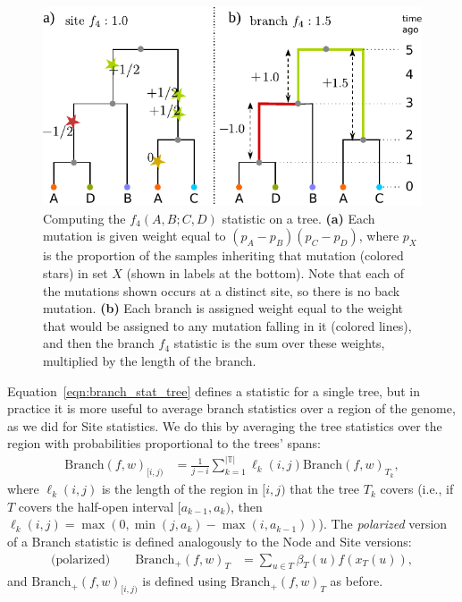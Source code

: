 \documentclass{article}
\newcommand{\branch}{\mbox{Branch}} %
\newcommand{\branchp}{\mbox{Branch}_+} %
\newcommand{\treeseq}{\mathbb{T}} %
\newcommand{\iw}{w} %
\newcommand{\nw}{x} %
\begin{document}
\begin{figure}
    \centering
    \includegraphics{figures/branch_site_diagram}
    \caption{
    Computing the $f_4(A,B;C,D)$ statistic on a tree.
    \textbf{(a)} Each mutation is given weight equal to $(p_A - p_B)(p_C - p_D)$,
    where $p_X$ is the proportion of the samples inheriting that mutation (colored stars) in set $X$
    (shown in labels at the bottom).
    Note that each of the mutations shown occurs at a distinct site, so there is no back mutation.
    \textbf{(b)} Each branch is assigned weight equal to the weight that would be assigned
    to any mutation falling in it (colored lines), and then the branch $f_4$ statistic
    is the sum over these weights, multiplied by the length of the branch.
        \label{fig:branch_site_diagram}
    }
\end{figure}

Equation~\eqref{eqn:branch_stat_tree} defines a statistic for a single tree,
but in practice it is more useful to average branch statistics
over a region of the genome, as we did for Site statistics.
We do this by averaging the tree statistics over the region
with probabilities proportional to the trees' spans:
\begin{align}
    \branch(f, \iw)_{[i,j)}
    &=
    \frac{1}{j-i} \sum_{k=1}^{|\treeseq|} \ell_k(i,j) \branch(f, \iw)_{T_k} ,
\end{align}
where $\ell_k(i,j)$ is the length of the region in $[i,j)$ that the tree $T_k$ covers
(i.e., if $T$ covers the half-open interval $[a_{k-1},a_k)$,
then $\ell_k(i,j) = \max(0, \min(j,a_k) - \max(i,a_{k-1}))$).
The \emph{polarized} version of a Branch statistic
is defined analogously to the Node and Site versions:
\begin{align} \label{eqn:branch_polarised}
    \text{(polarized)} \qquad
    \branchp(f, \iw)_T
    &=
    \sum_{u \in T} \beta_T(u) f(\nw_{T}(u)) ,
\end{align}
and $\branchp(f, \iw)_{[i,j)}$ is defined using $\branchp(f, \iw)_T$ as before.
\end{document}
